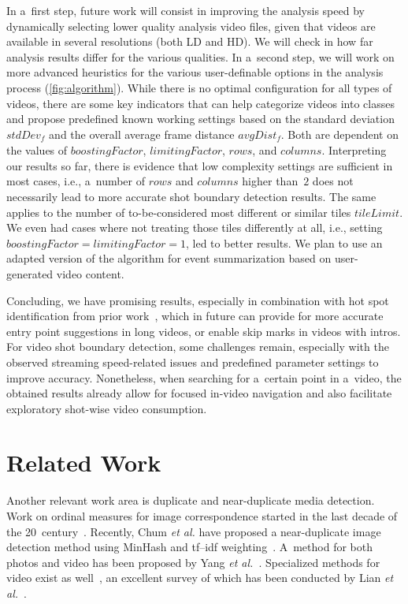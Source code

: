 In a~first step, future work will consist in improving the analysis speed by dynamically selecting lower quality analysis video files, given that videos are available in several resolutions (both LD and HD). We will check in how far analysis results differ for the various qualities. In a~second step, we will work on more advanced heuristics for the various user-definable options in the analysis process (\autoref{fig:algorithm}). While there is no optimal configuration for all types of videos, there are some key indicators that can help categorize videos into classes and propose predefined known working settings based on the standard deviation $\mathit{stdDev_{f}}$ and the overall average frame distance $\mathit{avgDist_{f}}$. Both are dependent on the values of $\mathit{boostingFactor}$, $\mathit{limitingFactor}$, $\mathit{rows}$, and $\mathit{columns}$. Interpreting our results so far, there is evidence that low complexity settings are sufficient in most cases, i.e., a~number of $\mathit{rows}$ and $\mathit{columns}$ higher than~$\mathit{2}$ does not necessarily lead to more accurate shot boundary detection results. The same applies to the number of to-be-considered most different or similar tiles $\mathit{tileLimit}$. We even had cases where not treating those tiles differently at all, i.e., setting $\mathit{boostingFactor} = \mathit{limitingFactor} = \mathit{1}$, led to better results. We plan to use an adapted version of the algorithm for event summarization based on user-generated video content.

Concluding, we have promising results, especially in combination with hot spot identification from prior work~\cite{derive2011}, which in future can provide for more accurate entry point suggestions in long videos, or enable skip marks in videos with intros.
For video shot boundary detection, some challenges remain, especially with the observed streaming speed-related issues and predefined parameter settings to improve accuracy. None\-theless, when searching for a~certain point in a~video, the obtained results already allow for focused in-video navigation and also facilitate exploratory shot-wise video consumption.


\section{Related Work}
\label{sec:related-work}

Another relevant work area is duplicate and near-duplicate media detection. Work on ordinal measures for image correspondence started in the last decade of the 20~century~\cite{Bhat}. Recently, Chum \emph{et al.} have proposed a near-duplicate image detection method using MinHash and tf--idf weighting~\cite{Chum}. A~method for both photos and video has been proposed by Yang \emph{et al.}~\cite{Yang}. Specialized methods for video exist as well~\cite{Min, Wu}, an excellent survey of which has been conducted by Lian \emph{et al.}~\cite{Lian}.



